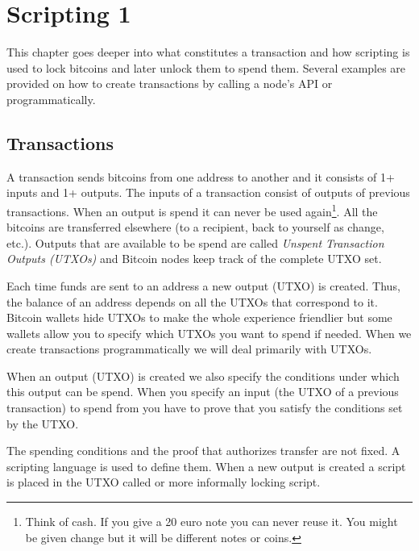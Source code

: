 \chapter{Scripting 1}
\label{ch:scripting-1}

\begin{summary}
This chapter goes deeper into what constitutes a transaction and how scripting is used to lock bitcoins and later unlock them to spend them. Several examples are provided on how to create transactions by calling a node’s API or programmatically.
\end{summary}

\section{Transactions}

A transaction sends bitcoins from one address to another and it consists of 1+ inputs and 1+ outputs. The inputs of a transaction consist of outputs of previous transactions. When an output is spend it can never be used again\footnote{Think of cash. If you give a 20 euro note you can never reuse it. You might be given change but it will be different notes or coins.}. All the bitcoins are transferred elsewhere (to a recipient, back to yourself as change, etc.). Outputs that are available to be spend are called \emph{Unspent Transaction Outputs (UTXOs)} and Bitcoin nodes keep track of the complete UTXO set.

\begin{note}
Each time funds are sent to an address a new output (UTXO) is created. Thus, the balance of an address depends on all the UTXOs that correspond to it. Bitcoin wallets hide UTXOs to make the whole experience friendlier but some wallets allow you to specify which UTXOs you want to spend if needed. When we create transactions programmatically we will deal primarily with UTXOs.
\end{note}

When an output (UTXO) is created we also specify the conditions under which this output can be spend. When you specify an input (the UTXO of a previous transaction) to spend from you have to prove that you satisfy the conditions set by the UTXO.

The spending conditions and the proof that authorizes transfer are not fixed. A scripting language is used to define them. When a new output is created a script is placed in the UTXO called  or more informally locking script.

